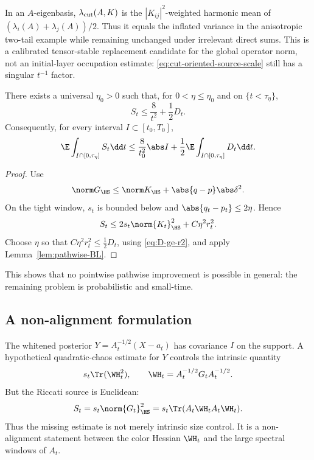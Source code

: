 \documentclass[../../main.tex]{subfiles}
\begin{document}
In an $A$-eigenbasis, $\lambda_{\rm cut}(A,K)$ is the $|K_{ij}|^2$-weighted harmonic
mean of $(\lambda_i(A)+\lambda_j(A))/2$. Thus it equals the inflated variance in the
anisotropic two-tail example while remaining unchanged under irrelevant direct sums. This is a
calibrated tensor-stable replacement candidate for the global operator norm, not an
initial-layer occupation estimate: \eqref{eq:cut-oriented-source-scale} still has a singular
$t^{-1}$ factor.

\begin{corollary}
\label{cor:away-from-zero}
There exists a universal $\eta_0>0$ such that, for $0<\eta\le\eta_0$ and on $\{t<\tau_\eta\}$,
\begin{equation}\label{eq:away-source}
  S_t\le\frac8{t^2}+\frac12D_t .
\end{equation}
Consequently, for every interval $I\subset[t_0,T_0]$,
\[
  \E\int_{I\cap[0,\tau_\eta]}S_t\dd t
  \le \frac8{t_0^2}\abs I+\frac12\E\int_{I\cap[0,\tau_\eta]}D_t\dd t .
\]
\end{corollary}

\begin{proof}
Use
\[
  \norm G_{\HS}\le\norm K_{\HS}+\abs{q-p}\abs\delta^2.
\]
On the tight window, $s_t$ is bounded below and $\abs{q_t-p_t}\le2\eta$. Hence
\[
  S_t\le2s_t\norm{K_t}_{\HS}^2+C\eta^2r_t^2.
\]
Choose $\eta$ so that $C\eta^2r_t^2\le\frac12D_t$, using \eqref{eq:D-ge-r2}, and apply
Lemma~\ref{lem:pathwise-BL}.
\end{proof}

This shows that no pointwise pathwise improvement is possible in general: the remaining problem is
probabilistic and small-time.

\subsection{A non-alignment formulation}

The whitened posterior $Y=A_t^{-1/2}(X-a_t)$ has covariance $I$ on the support. A hypothetical
quadratic-chaos estimate for $Y$ controls the intrinsic quantity
\[
  s_t\Tr(\WH_t^2),
  \qquad \WH_t=A_t^{-1/2}G_tA_t^{-1/2}.
\]
But the Riccati source is Euclidean:
\begin{equation}\label{eq:euclidean-source}
  S_t=s_t\norm{G_t}_{\HS}^2=s_t\Tr(A_t\WH_tA_t\WH_t).
\end{equation}
Thus the missing estimate is not merely intrinsic size control. It is a non-alignment statement
between the color Hessian $\WH_t$ and the large spectral windows of $A_t$.
\end{document}

